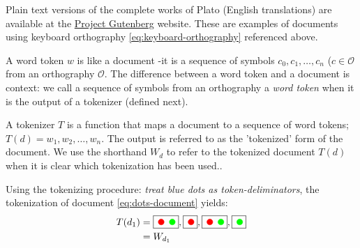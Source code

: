 \begin{example}\label{ex:doc-plato}
    Plain text versions of the complete works of Plato (English translations) are available at the \href{https://www.gutenberg.org/ebooks/author/93}{Project Gutenberg} website. These are examples of documents using keyboard orthography \ref{eq:keyboard-orthography} referenced above.
\end{example}

\begin{definition}
  A word token $w$ is like a document -it is a sequence of symbols $c_0,c_1,\dots,c_n$ ($c\in\mathscr{O}$ from an orthography $\mathscr{O}$. The difference between a word token and a document is context: we call a sequence of symbols from an orthography a \emph{word token} when it is the output of a tokenizer (defined next).
\end{definition}

\begin{definition}[Tokenizer]
   A tokenizer $T$ is a function that maps a document to a sequence of word tokens; $T(d)=w_1,w_2,\dots,w_n$. The output is referred to as the 'tokenized' form of the document. We use the shorthand $W_d$ to refer to the tokenized document $T(d)$ when it is clear which tokenization has been used.\footnotemark.
\end{definition}

\begin{example}\label{ex:doc-plato}
  Using the tokenizing procedure: \emph{treat blue dots as token-deliminators}, the tokenization of document \eqref{eq:dots-document} yields:
  \begin{align}
    T(d_1)&=\fbox{\mycirc[red] \mycirc[green]}, \fbox{\mycirc[red]}, \fbox{\mycirc[red] \mycirc[green]}, \fbox{\mycirc[green]}\label{eq:dots-tokenized}\\
    &=W_{d_1}\nonumber
  \end{align}
\end{example}

